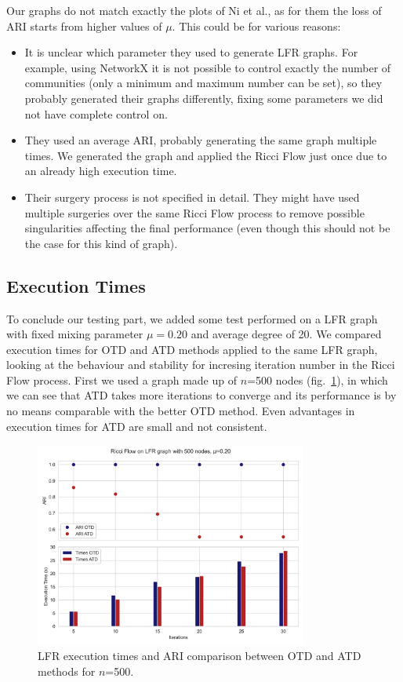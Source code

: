 Our graphs do not match exactly the plots of Ni et al., as for them the loss of ARI starts from higher values of $\mu$. This could be for various reasons:
\begin{itemize}
    \item It is unclear which parameter they used to generate LFR graphs. For example, using NetworkX it is not possible to control exactly the number of communities (only a minimum and maximum number can be set), so they probably generated their graphs differently, fixing some parameters we did not have complete control on.
    \item They used an average ARI, probably generating the same graph multiple times. We generated the graph and applied the Ricci Flow just once due to an already high execution time.
    \item Their surgery process is not specified in detail. They might have used multiple surgeries over the same Ricci Flow process to remove possible singularities affecting the final performance (even though this should not be the case for this kind of graph).
\end{itemize}

\subsection{Execution Times}
To conclude our testing part, we added some test performed on a LFR graph with fixed mixing parameter $\mu=0.20$ and average degree of 20. 
We compared execution times for OTD and ATD methods applied to the same LFR graph, looking at the behaviour and stability for incresing iteration number in the Ricci Flow process.
First we used a graph made up of $n$=500 nodes (fig.~\ref{fig:times_500}), in which we can see that ATD takes more iterations to converge and its performance is by no means comparable with the better OTD method. Even advantages in execution times for ATD are small and not consistent.
\begin{figure}
    \centering
    \includegraphics[width=0.8\textwidth]{../tests/LFRResults/Exe_times_LFR_500_nodes.png}
    \caption{LFR execution times and ARI comparison between OTD and ATD methods for $n$=500.}
    \label{fig:times_500}
\end{figure}

